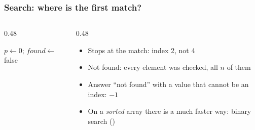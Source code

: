 \documentclass[aspectratio=169,10pt,compress]{beamer}
\begin{document}
\begin{frame}[t,fragile] \frametitle{Search: where is the first match?}
	\begin{columns}[T]
		\begin{column}{0.48\textwidth}
			\SetAlFnt{\small}




\begin{algorithm}[H]
				\caption{LinearSearch($a$, $x$)}
				$p \gets 0$; \quad $\mathit{found} \gets$ false\;
				 
\end{algorithm}

		\end{column}
		\begin{column}{0.48\textwidth}
			\begin{center}
			\end{center}
			\begin{itemize}\small
				\item Stops at the  match: index 2, not 4
				\item Not found: every element was checked, all $n$ of them
				\item Answer ``not found'' with a value that cannot be an index: $-1$
				\item On a \emph{sorted} array there is a much faster way: binary search
				      ()
			\end{itemize}
		\end{column}
	\end{columns}
\end{frame}
\end{document}
